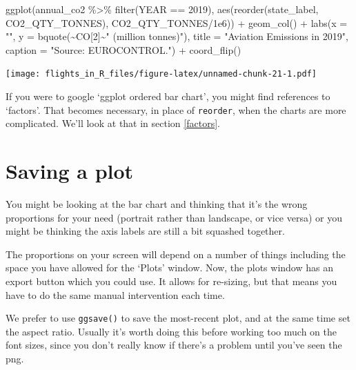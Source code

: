 \documentclass[
]{book}
\newenvironment{Shaded}{\begin{snugshade}}{\end{snugshade}}
\newcommand{\AttributeTok}[1]{\textcolor[rgb]{0.77,0.63,0.00}{#1}}
\newcommand{\DecValTok}[1]{\textcolor[rgb]{0.00,0.00,0.81}{#1}}
\newcommand{\FloatTok}[1]{\textcolor[rgb]{0.00,0.00,0.81}{#1}}
\newcommand{\FunctionTok}[1]{\textcolor[rgb]{0.00,0.00,0.00}{#1}}
\newcommand{\NormalTok}[1]{#1}
\newcommand{\SpecialCharTok}[1]{\textcolor[rgb]{0.00,0.00,0.00}{#1}}
\newcommand{\StringTok}[1]{\textcolor[rgb]{0.31,0.60,0.02}{#1}}
\begin{document}
\begin{Shaded}
\begin{Highlighting}[]
\FunctionTok{ggplot}\NormalTok{(annual\_co2 }\SpecialCharTok{\%\textgreater{}\%} 
         \FunctionTok{filter}\NormalTok{(YEAR }\SpecialCharTok{==} \DecValTok{2019}\NormalTok{), }
       \FunctionTok{aes}\NormalTok{(}\FunctionTok{reorder}\NormalTok{(state\_label, CO2\_QTY\_TONNES),}
\NormalTok{           CO2\_QTY\_TONNES}\SpecialCharTok{/}\FloatTok{1e6}\NormalTok{)) }\SpecialCharTok{+}
  \FunctionTok{geom\_col}\NormalTok{() }\SpecialCharTok{+}
  \FunctionTok{labs}\NormalTok{(}\AttributeTok{x =} \StringTok{""}\NormalTok{, }
       \AttributeTok{y =} \FunctionTok{bquote}\NormalTok{(}\SpecialCharTok{\textasciitilde{}}\NormalTok{CO[}\DecValTok{2}\NormalTok{]}\SpecialCharTok{\textasciitilde{}}\StringTok{" (million tonnes)"}\NormalTok{),}
       \AttributeTok{title =} \StringTok{"Aviation Emissions in 2019"}\NormalTok{,}
       \AttributeTok{caption =} \StringTok{"Source: EUROCONTROL."}\NormalTok{) }\SpecialCharTok{+}
  \FunctionTok{coord\_flip}\NormalTok{()}
\end{Highlighting}
\end{Shaded}

\texttt{[image: flights\_in\_R\_files/figure-latex/unnamed-chunk-21-1.pdf]}

If you were to google `ggplot ordered bar chart', you might find references to `factors'. That becomes necessary, in place of \texttt{reorder}, when the charts are more complicated. We'll look at that in section \ref{factors}.

\hypertarget{saving-a-plot}{%
\section{Saving a plot}\label{saving-a-plot}}

You might be looking at the bar chart and thinking that it's the wrong proportions for your need (portrait rather than landscape, or vice versa) or you might be thinking the axis labels are still a bit squashed together.

The proportions on your screen will depend on a number of things including the space you have allowed for the `Plots' window. Now, the plots window has an export button which you could use. It allows for re-sizing, but that means you have to do the same manual intervention each time.

We prefer to use \texttt{ggsave()} to save the most-recent plot, and at the same time set the aspect ratio. Usually it's worth doing this before working too much on the font sizes, since you don't really know if there's a problem until you've seen the png.
\end{document}

